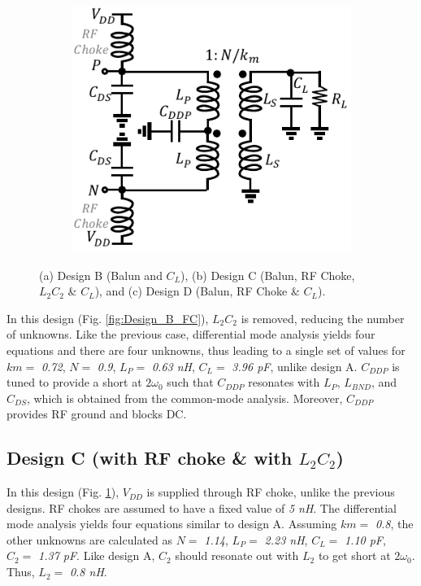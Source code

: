 \documentclass[conference]{IEEEtran}
\begin{document}
\begin{figure}[!t]
\begin{subfigure}{0.15\textwidth}
\caption{}
\label{fig:Design_C_FC}
\end{subfigure}
\centering
\begin{subfigure}{0.15\textwidth}
\centering
\includegraphics[width=1\textwidth]{Images/Design/Design_D_FC.pdf}
\caption{}
\label{fig:Design_D_FC}
\end{subfigure}
\caption{(a) Design B (Balun and $C_L$), (b) Design C (Balun, RF Choke, $L_2C_2$ \& $C_L$), and (c) Design D (Balun, RF Choke \& $C_L$).}
\label{fig:Design_B_C_D}
\vspace{-0.25in}
\end{figure}

In this design (Fig. \ref{fig:Design_B_FC}), $L_2C_2$ is removed, reducing the number of unknowns. Like the previous case, differential mode analysis yields four equations and there are four unknowns, thus leading to a single set of values for $km =$ \textit{0.72}, $N =$ \textit{0.9}, $L_P =$ \textit{0.63 nH}, $C_L =$ \textit{3.96 pF}, unlike design A. $C_{DDP}$ is tuned to provide a short at $2\omega_0$ such that $C_{DDP}$ resonates with $L_P$, $L_{BND}$, and $C_{DS}$, which is obtained from the common-mode analysis. Moreover, $C_{DDP}$ provides RF ground and blocks DC.

\subsection{Design C (with RF choke \& with $L_2C_2$)}
In this design (Fig. \ref{fig:Design_C_FC}), $V_{DD}$ is supplied through RF choke, unlike the previous designs. RF chokes are assumed to have a fixed value of \textit{5 nH}. The differential mode analysis yields four equations similar to design A. Assuming $km =$ \textit{0.8}, the other unknowns are calculated as $N =$ \textit{1.14}, $L_P =$ \textit{2.23 nH}, $C_L =$ \textit{1.10 pF}, $C_2 =$ \textit{1.37 pF}.
Like design A, $C_2$ should resonate out with $L_2$ to get short at $2\omega_0$. Thus, $L_2 =$ \textit{0.8 nH}. 
\end{document}
